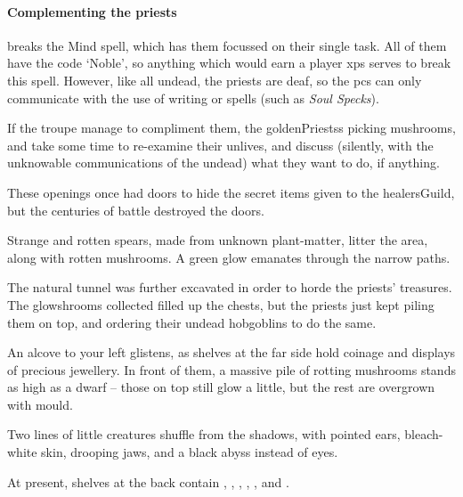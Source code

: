 \begin{multicols}{2}
\paragraph{Complementing the priests}
breaks the Mind spell, which has them focussed on their single task.
All of them have the code `Noble', so anything which would earn a player \glspl{xp} serves to break this spell.%
However, like all undead, the priests are deaf, so the \glspl{pc} can only communicate with the use of writing or spells (such as \textit{Soul Specks}).

If the troupe manage to compliment them, the \glspl{goldenPriests} picking mushrooms, and take some time to re-examine their unlives, and discuss (silently, with the unknowable communications of the undead) what they want to do, if anything.


\begin{exampletext}
  These openings once had doors to hide the secret items given to the \gls{healersGuild}, but the centuries of battle destroyed the doors.
\end{exampletext}

Strange and rotten spears, made from unknown plant-matter, litter the area, along with rotten mushrooms.
A green glow emanates through the narrow paths.


\begin{exampletext}
  The natural tunnel was further excavated in order to horde the priests' treasures.
  The glowshrooms collected filled up the chests, but the priests just kept piling them on top, and ordering their undead hobgoblins to do the same.
\end{exampletext}

\begin{boxtext}
  An alcove to your left glistens, as shelves at the far side hold coinage and displays of precious jewellery.
  In front of them, a massive pile of rotting mushrooms stands as high as a dwarf -- those on top still glow a little, but the rest are overgrown with mould.

  Two lines of little creatures shuffle from the shadows, with pointed ears, bleach-white skin, drooping jaws, and a black abyss instead of eyes.
\end{boxtext}

At present, shelves at the back contain \lootMedium, \lootJewellery, \lootJewellery, \lootJewellery, \lootJewellery, and \lootBig.


\end{multicols}
